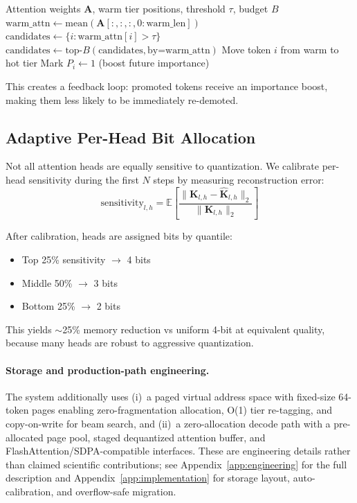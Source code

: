 \documentclass[11pt,a4paper]{article}
\begin{document}
\begin{algorithm}[H]
\caption{Retrieval-Aware Promotion}
\begin{algorithmic}[1]
\REQUIRE Attention weights $\mathbf{A}$, warm tier positions, threshold $\tau$, budget $B$
\STATE $\text{warm\_attn} \leftarrow \text{mean}(\mathbf{A}[:, :, :, 0:\text{warm\_len}])$
\STATE $\text{candidates} \leftarrow \{i : \text{warm\_attn}[i] > \tau\}$
    \STATE $\text{candidates} \leftarrow \text{top-}B(\text{candidates}, \text{by=warm\_attn})$
\ENDIF
{}
    \STATE Move token $i$ from warm to hot tier
    \STATE Mark $P_i \leftarrow 1$ (boost future importance)
\ENDFOR
\end{algorithmic}
\end{algorithm}

This creates a feedback loop: promoted tokens receive an importance boost, making them less likely to be immediately re-demoted.

\subsection{Adaptive Per-Head Bit Allocation}

Not all attention heads are equally sensitive to quantization. We calibrate per-head sensitivity during the first $N$ steps by measuring reconstruction error:
\begin{equation}
    \text{sensitivity}_{l,h} = \mathbb{E}\left[\frac{\|\mathbf{K}_{l,h} - \hat{\mathbf{K}}_{l,h}\|_2}{\|\mathbf{K}_{l,h}\|_2}\right]
\end{equation}

After calibration, heads are assigned bits by quantile:
\begin{itemize}
    \item Top 25\% sensitivity $\rightarrow$ 4 bits
    \item Middle 50\% $\rightarrow$ 3 bits
    \item Bottom 25\% $\rightarrow$ 2 bits
\end{itemize}

This yields $\sim$25\% memory reduction vs uniform 4-bit at equivalent quality, because many heads are robust to aggressive quantization.

\paragraph{Storage and production-path engineering.} The system additionally uses (i)~a paged virtual address space with fixed-size 64-token pages enabling zero-fragmentation allocation, O(1) tier re-tagging, and copy-on-write for beam search, and (ii)~a zero-allocation decode path with a pre-allocated page pool, staged dequantized attention buffer, and FlashAttention/SDPA-compatible interfaces. These are engineering details rather than claimed scientific contributions; see Appendix~\ref{app:engineering} for the full description and Appendix~\ref{app:implementation} for storage layout, auto-calibration, and overflow-safe migration.
\end{document}

